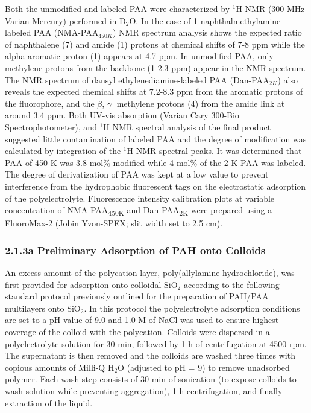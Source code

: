 \documentclass[journal=mamobx,manuscript=article]{achemso}
\begin{document}
Both the unmodified and labeled PAA were characterized by $^{1}$H NMR (300 MHz Varian Mercury) performed in D$_2$O.  In the case of 1-naphthalmethylamine-labeled PAA (NMA-PAA$_{450K}$) NMR spectrum analysis shows the expected ratio of naphthalene (7) and amide (1) protons at chemical shifts of 7-8 ppm while the alpha aromatic proton (1) appears at 4.7 ppm.  In unmodified PAA, only methylene protons from the backbone (1-2.3 ppm) appear in the NMR spectrum.  The NMR spectrum of dansyl ethylenediamine-labeled PAA (Dan-PAA$_{2K}$) also reveals the expected chemical shifts at 7.2-8.3 ppm from the aromatic protons of the fluorophore, and the $\beta$, $\gamma$ methylene protons (4) from the amide link at around 3.4 ppm.  Both UV-vis absorption (Varian Cary 300-Bio Spectrophotometer), and $^{1}$H NMR spectral analysis of the final product suggested little contamination of labeled PAA and the degree of modification was calculated by integration of the $^{1}$H NMR spectral peaks.  It was determined that PAA of 450 K was 3.8 mol\% modified while 4 mol\% of the 2 K PAA was labeled.  The degree of derivatization of PAA was kept at a low value to prevent interference from the hydrophobic fluorescent tags on the electrostatic adsorption of the polyelectrolyte.  Fluorescence intensity calibration plots at variable concentration of NMA-PAA\textsubscript{450K} and Dan-PAA\textsubscript{2K} were prepared using a FluoroMax-2 (Jobin Yvon-SPEX; slit width set to 2.5 cm). 

\subsubsection{2.1.3a Preliminary Adsorption of PAH onto Colloids}   %
    \label{sec-prelPAH}


An excess amount of the polycation layer, poly(allylamine hydrochloride), was first provided for adsorption onto colloidal SiO$_2$ according to the following standard protocol previously outlined for the preparation of PAH/PAA multilayers onto SiO$_2$.\cite{Burke2003}  In this protocol the polyelectrolyte adsorption conditions are set to a pH value of 9.0 and 1.0 M of NaCl was used to ensure highest coverage of the colloid with the polycation.  Colloids were dispersed in a polyelectrolyte solution for 30 min, followed by 1 h of centrifugation at 4500 rpm.  The supernatant is then removed and the colloids are washed three times with copious amounts of Milli-Q H$_2$O (adjusted to pH = 9) to remove unadsorbed polymer.  Each wash step consists of 30 min of sonication (to expose colloids to wash solution while preventing aggregation), 1 h centrifugation, and finally extraction of the liquid.  
\end{document}
